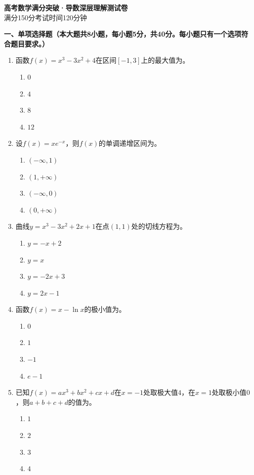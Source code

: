 \documentclass[12pt, a4paper]{ctexart}
\newcommand{\blank}[1]{\underline{\hspace{#1}}}
\begin{document}
\begin{center}
{\LARGE\bfseries 高考数学满分突破·导数深层理解\quad 测试卷}\\[0.5em]
{\large 满分150分\quad 考试时间120分钟}
\end{center}

\vspace{1em}

\noindent\textbf{一、单项选择题（本大题共8小题，每小题5分，共40分。每小题只有一个选项符合题目要求。）}

\begin{enumerate}
\item 函数$f(x)=x^3-3x^2+4$在区间$[-1,3]$上的最大值为\blank{3cm}。
\begin{enumerate}[label=\Alph*.]
\item $0$
\item $4$
\item $8$
\item $12$
\end{enumerate}

\item 设$f(x)=xe^{-x}$，则$f(x)$的单调递增区间为\blank{3cm}。
\begin{enumerate}[label=\Alph*.]
\item $(-\infty,1)$
\item $(1,+\infty)$
\item $(-\infty,0)$
\item $(0,+\infty)$
\end{enumerate}

\item 曲线$y=x^3-3x^2+2x+1$在点$(1,1)$处的切线方程为\blank{3cm}。
\begin{enumerate}[label=\Alph*.]
\item $y=-x+2$
\item $y=x$
\item $y=-2x+3$
\item $y=2x-1$
\end{enumerate}

\item 函数$f(x)=x-\ln x$的极小值为\blank{3cm}。
\begin{enumerate}[label=\Alph*.]
\item $0$
\item $1$
\item $-1$
\item $e-1$
\end{enumerate}

\item 已知$f(x)=ax^3+bx^2+cx+d$在$x=-1$处取极大值$4$，在$x=1$处取极小值$0$，则$a+b+c+d$的值为\blank{3cm}。
\begin{enumerate}[label=\Alph*.]
\item $1$
\item $2$
\item $3$
\item $4$
\end{enumerate}


\end{enumerate}
\end{document}
